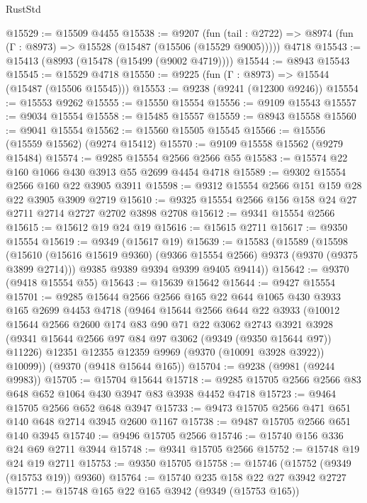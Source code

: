 \begin{lexlean}{RustStd}
\begin{coremodule}
@15529 := @15509 @4455
@15538 := @9207
    (fun (tail : @2722) => @8974 (fun (Γ : @8973) => @15528 (@15487 (@15506 (@15529 @9005)))))
    @4718
@15543 := @15413 (@8993 (@15478 (@15499 (@9002 @4719))))
@15544 := @8943 @15543
@15545 := @15529 @4718
@15550 := @9225 (fun (Γ : @8973) => @15544 (@15487 (@15506 @15545)))
@15553 := @9238 (@9241 (@12300 @9246))
@15554 := @15553 @9262
@15555 := @15550 @15554
@15556 := @9109 @15543
@15557 := @9034 @15554
@15558 := @15485 @15557
@15559 := @8943 @15558
@15560 := @9041 @15554
@15562 := @15560 @15505 @15545
@15566 := @15556 (@15559 @15562) (@9274 @15412)
@15570 := @9109 @15558 @15562 (@9279 @15484)
@15574 := @9285 @15554 @2566 @2566 @55
@15583 := @15574 @22 @160 @1066 @430 @3913 @55 @2699 @4454 @4718
@15589 := @9302 @15554 @2566 @160 @22 @3905 @3911
@15598 := @9312 @15554 @2566 @151 @159 @28 @22 @3905 @3909 @2719
@15610 := @9325 @15554 @2566 @156 @158 @24 @27 @2711 @2714 @2727 @2702 @3898 @2708
@15612 := @9341 @15554 @2566
@15615 := @15612 @19 @24 @19
@15616 := @15615 @2711
@15617 := @9350 @15554
@15619 := @9349 (@15617 @19)
@15639 := @15583
    (@15589
      (@15598
        (@15610 (@15616 @15619 @9360) (@9366 @15554 @2566) @9373 (@9370 (@9375 @3899 @2714)))
        @9385
        @9389
        @9394
        @9399
        @9405
        @9414))
@15642 := @9370 (@9418 @15554 @55)
@15643 := @15639 @15642
@15644 := @9427 @15554
@15701 := @9285
    @15644
    @2566
    @2566
    @165
    @22
    @644
    @1065
    @430
    @3933
    @165
    @2699
    @4453
    @4718
    (@9464
      @15644
      @2566
      @644
      @22
      @3933
      (@10012
        @15644
        @2566
        @2600
        @174
        @83
        @90
        @71
        @22
        @3062
        @2743
        @3921
        @3928
        (@9341 @15644 @2566 @97 @84 @97 @3062 (@9349 (@9350 @15644 @97)) @11226)
        @12351
        @12355
        @12359
        @9969
        (@9370 (@10091 @3928 @3922))
        @10099))
    (@9370 (@9418 @15644 @165))
@15704 := @9238 (@9981 (@9244 @9983))
@15705 := @15704 @15644
@15718 := @9285 @15705 @2566 @2566 @83 @648 @652 @1064 @430 @3947 @83 @3938 @4452 @4718
@15723 := @9464 @15705 @2566 @652 @648 @3947
@15733 := @9473 @15705 @2566 @471 @651 @140 @648 @2714 @3945 @2600 @1167
@15738 := @9487 @15705 @2566 @651 @140 @3945
@15740 := @9496 @15705 @2566
@15746 := @15740 @156 @336 @24 @69 @2711 @3944
@15748 := @9341 @15705 @2566
@15752 := @15748 @19 @24 @19 @2711
@15753 := @9350 @15705
@15758 := @15746 (@15752 (@9349 (@15753 @19)) @9360)
@15764 := @15740 @235 @158 @22 @27 @3942 @2727
@15771 := @15748 @165 @22 @165 @3942 (@9349 (@15753 @165))

\end{coremodule}
\end{lexlean}
